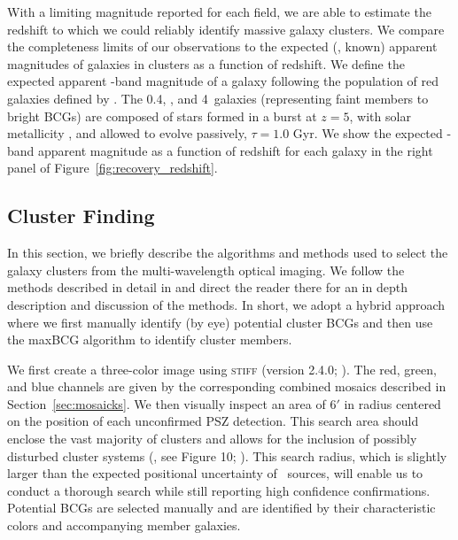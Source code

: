 \documentclass[apj, revtex4-1]{emulateapj}
\begin{document}
With a limiting magnitude reported for each field, we are able to estimate the redshift to which we could reliably identify massive galaxy clusters. We compare the completeness limits of our observations to the expected (\ie, known) apparent magnitudes of galaxies in clusters as a function of redshift. We define the expected apparent \sdssi-band magnitude of a galaxy following the population of red galaxies defined by \cite{Blanton2003}. The 0.4\lstar, \lstar, and 4\lstar\ galaxies (representing faint members to bright BCGs) are composed of stars formed in a burst at $z = 5$, with solar metallicity \citep{Bruzual2003}, and allowed to evolve passively, $\tau = 1.0$ Gyr. We show the expected \sdssi-band apparent magnitude as a function of redshift for each galaxy in the right panel of Figure~\ref{fig:recovery_redshift}.

\subsection{Cluster Finding}\label{sec:cluster finding}
In this section, we briefly describe the algorithms and methods used to select the galaxy clusters from the multi-wavelength optical imaging. We follow the methods described in detail in \cite{Menanteau2009a, Menanteau2010} and direct the reader there for an in depth description and discussion of the methods. In short, we adopt a hybrid approach where we first manually identify (by eye) potential cluster BCGs and then use the maxBCG algorithm \citep{Koester2007} to identify cluster members.

We first create a three-color image using \textsc{stiff} (version 2.4.0; \citealt{Bertin2011}). The red, green, and blue channels are given by the corresponding combined mosaics described in Section~\ref{sec:mosaicks}. We then visually inspect an area of $6'$ in radius centered on the position of each unconfirmed PSZ detection. This search area should enclose the vast majority of clusters  and allows for the inclusion of possibly disturbed cluster systems (\eg, see Figure 10; \citealt{PlanckCollaboration2015a}). This search radius, which is slightly larger than the expected positional uncertainty of \planck\ sources, will enable us to conduct a thorough search while still reporting high confidence confirmations. Potential BCGs are selected manually and are identified by their characteristic colors and accompanying member galaxies.
\end{document}
